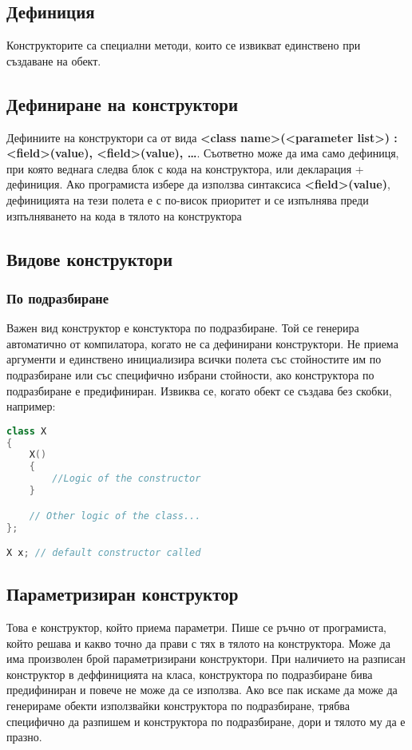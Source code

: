 \documentclass[fleqn,12pt]{article}
\begin{document}
\subsection{Дефиниция}
Конструкторите са специални методи, които се извикват единствено при създаване на обект.

\subsection{Дефиниране на конструктори}
Дефиниите на конструктори са от вида \textbf{<class name>(<parameter list>) : <field>(value), <field>(value), \dots}.
Съответно може да има само дефиниця, при която веднага следва блок с кода на конструктора,
или декларация + дефиниция. Ако програмиста избере да използва синтаксиса \textbf{<field>(value)}, дефиницията на тези полета е с по-висок приоритет и се изпълнява преди изпълняването на кода в тялото на конструктора 

\subsection{Видове конструктори}
\subsubsection{По подразбиране}
Важен вид конструктор е констуктора по подразбиране. Той се генерира автоматично от компилатора, 
когато не са дефинирани конструктори. Не приема аргументи и единствено инициализира всички полета със стойностите им по подразбиране или със специфично избрани стойности, ако конструктора по подразбиране е предифиниран.
Извиква се, когато обект се създава без скобки, например:
\begin{lstlisting}[language=C++, caption=Default constructor]
class X
{
    X()
    {
        //Logic of the constructor
    }

    // Other logic of the class...
};

X x; // default constructor called
\end{lstlisting}

\subsection{Параметризиран конструктор}
Това е конструктор, който приема параметри. Пише се ръчно от програмиста, който решава и какво точно да прави с тях
в тялото на конструктора. Може да има произволен брой параметризирани конструктори. При наличието на разписан конструктор в деффиницията на класа, конструктора по подразбиране бива предифиниран и повече не може да се използва. Ако все пак искаме да може да генерираме обекти използвайки конструктора по подразбиране, трябва специфично да разпишем и конструктора по подразбиране, дори и тялото му да е празно.
\end{document}

